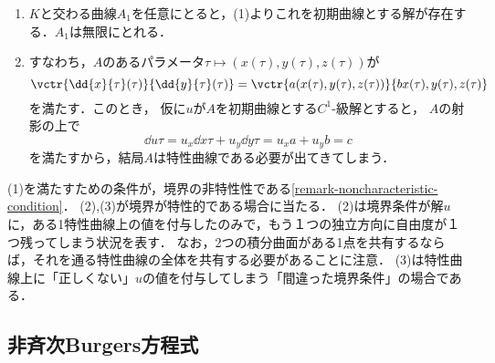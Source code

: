 \documentclass[uplatex,dvipdfmx]{jsreport}
\begin{document}
\begin{Proof}
\begin{enumerate}
\begin{description}
        \end{description}
        \item $K$と交わる曲線$A_1$を任意にとると，(1)よりこれを初期曲線とする解が存在する．$A_1$は無限にとれる．
        \item すなわち，$A$のあるパラメータ$\tau\mapsto(x(\tau),y(\tau),z(\tau))$が
        \[\vctr{\dd{x}{\tau}(\tau)}{\dd{y}{\tau}(\tau)}=\vctr{a(x(\tau),y(\tau),z(\tau))}{bx(\tau),y(\tau),z(\tau)}\]
        を満たす．このとき，
        仮に$u$が$A$を初期曲線とする$C^1$-級解とすると，
        $A$の射影の上で
        \[\dd{u}{\tau}=u_x\dd{x}{\tau}+u_y\dd{y}{\tau}=u_xa+u_yb=c\]
        を満たすから，結局$A$は特性曲線である必要が出てきてしまう．
    \end{enumerate}
\end{Proof}
\begin{remarks}
    (1)を満たすための条件が，境界の非特性性である\ref{remark-noncharacteristic-condition}．
    (2),(3)が境界が特性的である場合に当たる．
    (2)は境界条件が解$u$に，ある1特性曲線上の値を付与したのみで，もう１つの独立方向に自由度が１つ残ってしまう状況を表す．
    なお，2つの積分曲面がある1点を共有するならば，それを通る特性曲線の全体を共有する必要があることに注意．
    (3)は特性曲線上に「正しくない」$u$の値を付与してしまう「間違った境界条件」の場合である．
\end{remarks}

\subsection{非斉次Burgers方程式}
\end{document}
